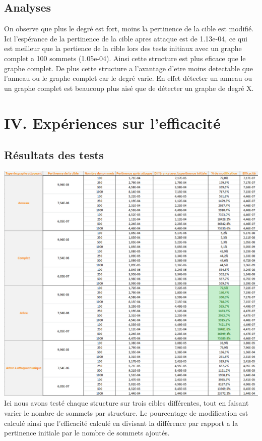 \documentclass[a4paper,11pt]{article}
\begin{document}
	\subsection{Analyses}
		On observe que plus le degré est fort, moins la pertinence de la cible est modifié. Ici l'espérance de la pertinence de la cible apres attaque est de 1.13e-04, ce qui est 
		meilleur que la pertience de la cible lors des tests initiaux avec un graphe complet a 100 sommets (1.05e-04). Ainsi cette structure est plus eficace que le graphe complet.
		De plus cette structure a l'avantage d'etre moins detectable que l'anneau ou le graphe complet car le degré varie. En effet détecter un anneau ou un graphe complet est beaucoup plus aisé 
		que de détecter un graphe de degré X.
	
\section{IV.	Expériences sur l'efficacité}
	
	\subsection{Résultats des tests}
		\includegraphics[scale = 0.5]{Captures/ranking5.PNG}\\
		Ici nous avons testé chaque structure sur trois cibles différentes, tout en faisant varier le nombre de sommets par structure. 
		Le pourcentage de modification est calculé ainsi que l'efficacité calculé en divisant la différence par rapport a la pertinence initiale par le nombre de sommets ajoutés.\\
\end{document}

